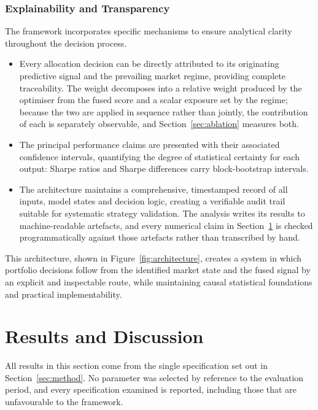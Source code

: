 \documentclass{singlecol-new}
\theoremstyle{TH}{
\newtheorem{lemma}{Lemma}
\newtheorem{theorem}[lemma]{Theorem}
\newtheorem{corrolary}[lemma]{Corrolary}
\newtheorem{conjecture}[lemma]{Conjecture}
\newtheorem{proposition}[lemma]{Proposition}
\newtheorem{claim}[lemma]{Claim}
\newtheorem{stheorem}[lemma]{Wrong Theorem}
\newtheorem{algorithm}{Algorithm}
}
\theoremstyle{THrm}{
\newtheorem{definition}{Definition}[section]
\newtheorem{question}{Question}[section]
\newtheorem{remark}{Remark}
\newtheorem{scheme}{Scheme}
}
\theoremstyle{THhit}{
\newtheorem{case}{Case}[section]
}
\begin{document}
\subsubsection{Explainability and Transparency}

The framework incorporates specific mechanisms to ensure analytical clarity throughout
the decision process.

\begin{itemize}
\item Every allocation decision can be directly attributed to its originating predictive
signal and the prevailing market regime, providing complete traceability. The weight
decomposes into a relative weight produced by the optimiser from the fused score and a
scalar exposure set by the regime; because the two are applied in sequence rather than
jointly, the contribution of each is separately observable, and
Section~\ref{sec:ablation} measures both.
\item The principal performance claims are presented with their associated confidence
intervals, quantifying the degree of statistical certainty for each output: Sharpe ratios
and Sharpe differences carry block-bootstrap intervals.
\item The architecture maintains a comprehensive, timestamped record of all inputs, model
states and decision logic, creating a verifiable audit trail suitable for systematic
strategy validation. The analysis writes its results to machine-readable artefacts, and
every numerical claim in Section~\ref{sec:results} is checked programmatically against
those artefacts rather than transcribed by hand.
\end{itemize}

This architecture, shown in Figure~\ref{fig:architecture}, creates a system in which
portfolio decisions follow from the identified market state and the fused signal by an
explicit and inspectable route, while maintaining causal statistical foundations and
practical implementability.

\section{Results and Discussion}
\label{sec:results}

All results in this section come from the single specification set out in
Section~\ref{sec:method}. No parameter was selected by reference to the evaluation
period, and every specification examined is reported, including those that are
unfavourable to the framework.
\end{document}
